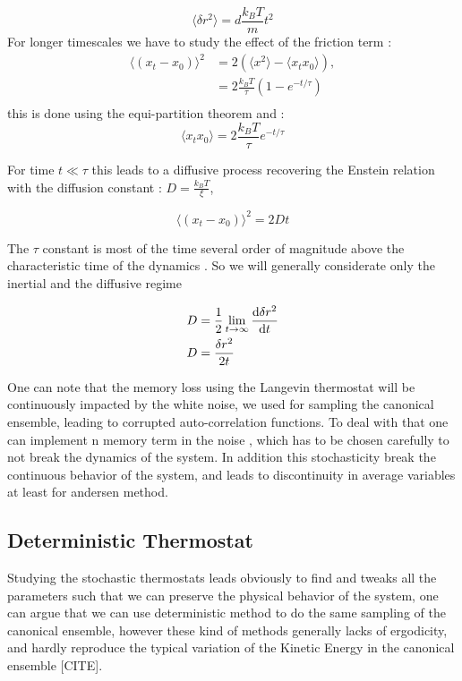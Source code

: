 \documentclass[ansiapaper]{report}
\begin{document}
\begin{multicols}{3}
    $$\langle \delta r^2\rangle = d \frac{k_B T}{m}t^2$$
For longer timescales we have to study the effect of the friction term : 
\begin{align*}
  \langle \left( x_t - x_0\right)\rangle^2 &= 2 \left(\langle x^2 \rangle - \langle x_t x_0\rangle \right),\\
 &= 2\frac{k_B T}{\tau} \left(1 - e^{-t/\tau}\right)\\
\end{align*}
    this is done using the equi-partition theorem and : 
     $$\langle x_t x_0 \rangle = 2 \frac{k_B T}{\tau}e^{-t/ \tau} $$

For time $ t \ll \tau$ this leads to a diffusive process recovering the Enstein relation with the diffusion constant : 
 $ D = \frac{k_B T}{\xi}$, 

  $$\langle \left( x_t - x_0\right)\rangle^2  = 2Dt$$

  The $\tau$ constant is most of the time several order of magnitude above the characteristic time of the dynamics \cite{Correlation}. So we will generally considerate only the inertial and the diffusive regime


\begin{align}
    D &= \frac{1}{2}\lim_{t \rightarrow \infty} \dv{\delta r^2}{t} \label{eq:msd_grad}\\
    D &= \frac{\delta r^2}{2t} \label{eq:msd_diff}
\end{align}


One can note that the memory loss using the Langevin thermostat will be continuously impacted by the white noise, we used for sampling the canonical ensemble, leading to corrupted auto-correlation functions. To deal with that one can implement n memory term in the noise \cite{Correlation, MD_theo}, which has to be chosen carefully to not break the dynamics of the system. In addition this stochasticity break the continuous behavior of the system, and leads to discontinuity in average variables at least for andersen method.
\subsection{Deterministic Thermostat}

Studying the stochastic thermostats leads obviously to find and tweaks all the parameters such that we can preserve the physical behavior of the system, one can argue that we can use deterministic method to do the same sampling of the canonical ensemble, however these kind of methods generally lacks of ergodicity, and hardly reproduce the typical variation of the Kinetic Energy in the canonical ensemble [CITE].


\end{multicols}
\end{document}
